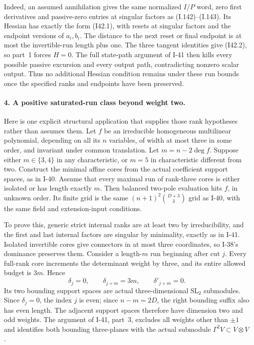 Indeed, an assumed annihilation gives the same normalized
$I/P$ word, zero first derivatives and passive-zero entries
at singular factors as (I.142)--(I.143). Its Hessian has exactly
the form (I42.1), with resets at singular factors and the
endpoint versions of $a_i,b_i$. The distance to the next reset
or final endpoint is at most the invertible-run length plus
one. The three tangent identities give (I42.2), so part~1
forces $H=0$. The full state-path argument of I-41 then kills
every possible passive excursion and every output path,
contradicting nonzero scalar output. Thus no additional
Hessian condition remains under these run bounds once the
specified ranks and endpoints have been preserved.

\paragraph{4. A positive saturated-run class beyond weight two.}
Here is one explicit structural application that supplies those
rank hypotheses rather than assumes them. Let $f$ be an
irreducible homogeneous multilinear polynomial, depending on
all its $n$ variables, of width at most three in some order,
and invariant under common translation. Let
$m=n-2\deg f$. Suppose either $m\in\{3,4\}$ in any
characteristic, or $m=5$ in characteristic different from two.
Construct the minimal affine cores from the actual coefficient
support spaces, as in I-40. Assume that every maximal run of
rank-three cores is either isolated or has length exactly $m$.
Then balanced two-pole evaluation hits $f$, in unknown order.
Its finite grid is the same
$(n+1)^2\binom{D+3}{3}$ grid as I-40, with the same field
and extension-input conditions.

To prove this, generic strict internal ranks are at least two
by irreducibility, and the first and last internal factors
are singular by minimality, exactly as in I-41. Isolated
invertible cores give connectors in at most three coordinates,
so I-38's dominance preserves them. Consider a length-$m$
run beginning after cut $j$. Every full-rank core increments
the determinant weight by three, and its entire allowed
budget is $3m$. Hence
\[
 \delta_j=0,\qquad\delta_{j+m}=3m,
 \qquad\delta'_{j+m}=0.
 \tag{I42.8}
\]
Its two bounding support spaces are actual three-dimensional
$\mathrm{SL}_2$ submodules. Since $\delta_j=0$, the index
$j$ is even; since $n-m=2D$, the right bounding suffix also
has even length. The adjacent support spaces therefore have
dimension two and odd weights. The argument of I-41,
part~3, excludes all weights other than $\pm1$ and identifies
both bounding three-planes with the actual submodule
$\Gamma^2V\subset V\otimes V$.

